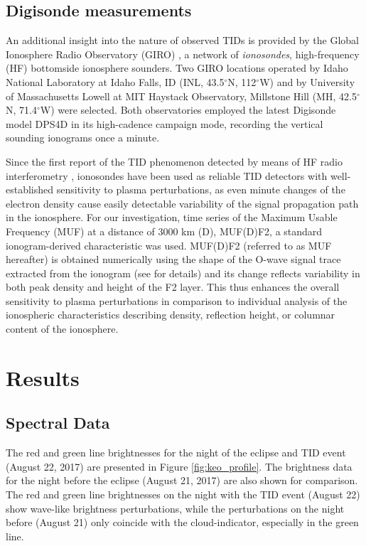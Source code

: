 \documentclass[crop=false,class=mitthesis,oneside,font=12pt]{standalone}
\begin{document}
\subsection{Digisonde measurements}
\label{digi_m}

An additional insight into the nature of observed TIDs is provided by the Global Ionosphere Radio Observatory (GIRO) \citep{reinisch2011global}, a network of \textit{ionosondes}, high-frequency (HF) bottomside ionosphere sounders. Two GIRO locations operated by Idaho National Laboratory at Idaho Falls, ID (INL, 43.5$^\circ$N, 112$^\circ$W) and by University of Massachusetts Lowell at MIT Haystack Observatory, Millstone Hill (MH, 42.5$^\circ$N, 71.4$^\circ$W) were selected. Both observatories employed the latest Digisonde model DPS4D \citep{reinisch2009new,digisonde.com} in its high-cadence campaign mode, recording the vertical sounding ionograms once a minute. 
% 
% 

Since the first report of the TID phenomenon detected by means of HF radio interferometry \citep{munro1950travelling}, ionosondes have been used as reliable TID detectors with well-established sensitivity to plasma perturbations, as even minute changes of the electron density cause easily detectable variability of the signal propagation path in the ionosphere. For our investigation, time series of the Maximum Usable Frequency (MUF) at a distance of 3000 km (D), MUF(D)F2, a standard ionogram-derived characteristic was used. MUF(D)F2 (referred to as MUF hereafter) is obtained numerically using the shape of the O-wave signal trace extracted from the ionogram (see \citep{davies1989ionospheric} for details) and its change reflects variability in both peak density and height of the F2 layer. This thus enhances the overall sensitivity to plasma perturbations in comparison to individual analysis of the ionospheric characteristics describing density, reflection height, or columnar content of the ionosphere.

\section{Results}

\subsection{Spectral Data}
 The red and green line brightnesses for the night of the eclipse and TID event (August 22, 2017) are presented in Figure \ref{fig:keo_profile}. The brightness data for the night before the eclipse (August 21, 2017) are also shown for comparison. The red and green line brightnesses on the night with the TID event (August 22) show wave-like brightness perturbations, while the perturbations on the night before (August 21) only coincide with the cloud-indicator, especially in the green line.
\end{document}
